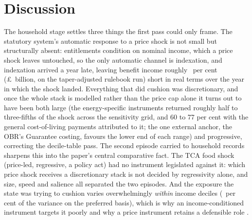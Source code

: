 \section{Discussion}\label{sec:discussion}

The household stage settles three things the first pass could only
frame. The statutory system's automatic response to a price shock is
not small but structurally absent: entitlements condition on nominal
income, which a price shock leaves untouched, so the only automatic
channel is indexation, and indexation arrived a year late, leaving benefit income roughly
\SsVinLagPctOfBase\ per cent (\pounds\SsVinLagCostBn\ billion, on
the taper-adjusted rulebook run) short in real terms over the year in
which the shock landed. Everything that did cushion was
discretionary, and once the whole stack is modelled rather than the
price cap alone it turns out to have been both large
(the energy-specific instruments returned roughly half to
three-fifths of the shock across the sensitivity grid, and 60 to 77
per cent with the general cost-of-living payments attributed to it;
the one external anchor, the OBR's Guarantee costing, favours the
lower end of each range)
and progressive, correcting the decile-table pass. The second episode carried to household records sharpens this into
the paper's central comparative fact. The TCA food shock (price-led,
regressive, a policy act) had no instrument legislated against it:
which price shock receives a discretionary stack is not decided by
regressivity alone, and size, speed and salience all separated the
two episodes. And the
exposure the state was trying to cushion varies
overwhelmingly \emph{within} income deciles
(\SsWithinPct\ per cent of the variance on the preferred basis), which is why an
income-conditioned instrument targets it poorly and why a price
instrument retains a defensible role \citep{levell2025}.

